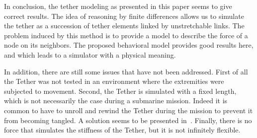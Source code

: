 In conclusion, the tether modeling as presented in this paper seems to give correct results. The idea of reasoning by finite differences allows us to simulate the tether as a succession of tether elements linked by unstretchable links. The problem induced by this method is to provide a model to describe the force of a node on its neighbors. The proposed behavioral model provides good results here, and which leads to a simulator with a physical meaning.

In addition, there are still some issues that have not been addressed. First of all the Tether was not tested in an environment where the extremities were subjected to movement. Second, the Tether is simulated with a fixed length, which is not necessarily the case during a submarine mission. Indeed it is common to have to unroll and rewind the Tether during the mission to prevent it from becoming tangled. A solution seems to be presented in~\cite{ganoni_visually_2018}.  Finally, there is no force that simulates the stiffness of the Tether, but it is not infinitely flexible.